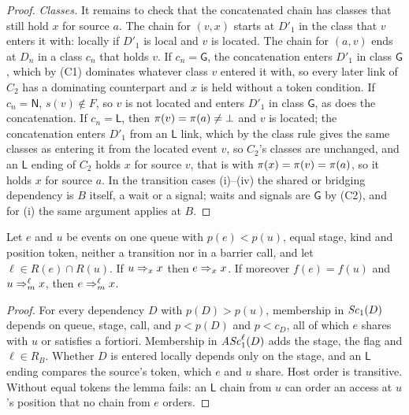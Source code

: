\begin{proof}
\emph{Classes.} It remains to check that the concatenated chain has classes that still hold $x$ for source $a$. The
chain for $(v,x)$ starts at $D'_1$ in the class that $v$ enters it with: locally if $D'_1$ is local and $v$ is
located. The chain for $(a,v)$ ends at $D_n$ in a class $c_n$ that holds $v$. If $c_n = \mathsf{G}$, the
concatenation enters $D'_1$ in class $\mathsf{G}$, which by (C1) dominates whatever class $v$ entered it with, so
every later link of $C_2$ has a dominating counterpart and $x$ is held without a token condition. If $c_n =
\mathsf{N}$, $s(v) \notin F$, so $v$ is not located and enters $D'_1$ in class $\mathsf{G}$, as does the
concatenation. If $c_n = \mathsf{L}$, then $\pi(v) = \pi(a) \ne \bot$ and $v$ is located; the concatenation
enters $D'_1$ from an $\mathsf{L}$ link, which by the class rule gives the same classes as entering it from the located
event $v$, so $C_2$'s classes are unchanged, and an $\mathsf{L}$ ending of $C_2$ holds $x$ for source $v$, that is with
$\pi(x) = \pi(v) = \pi(a)$, so it holds $x$ for source $a$. In the transition cases (i)--(iv) the shared or
bridging dependency is $B$ itself, a wait or a signal; waits and signals are $\mathsf{G}$ by (C2), and for (i) the
same argument applies at $B$.
\end{proof}

\begin{lemma}[Substitution]\label{lem:subst}
Let $e$ and $u$ be events on one queue with $p(e) < p(u)$, equal stage, kind and position token, neither a transition
nor in a barrier call, and let $\ell \in R(e) \cap R(u)$. If $u \Rightarrow_{x} x$ then $e \Rightarrow_{x} x$. If moreover $f(e) = f(u)$ and $u
\Rightarrow_{m}^{\ell} x$, then $e \Rightarrow_{m}^{\ell} x$.
\end{lemma}
\begin{proof}
For every dependency $D$ with $p(D) > p(u)$, membership in $\mathit{Sc}_{1}(D)$ depends on queue, stage, call, and $p < p(D)$ and
$p < c_D$, all of which $e$ shares with $u$ or satisfies a fortiori. Membership in $\mathit{ASc}_{1}^{\ell}(D)$ adds the stage,
the flag and $\ell \in R_B$. Whether $D$ is entered locally depends only on the stage, and an $\mathsf{L}$ ending
compares the source's token, which $e$ and $u$ share. Host order is transitive. Without equal tokens the lemma fails:
an $\mathsf{L}$ chain from $u$ can order an access at $u$'s position that no chain from $e$ orders.
\end{proof}

